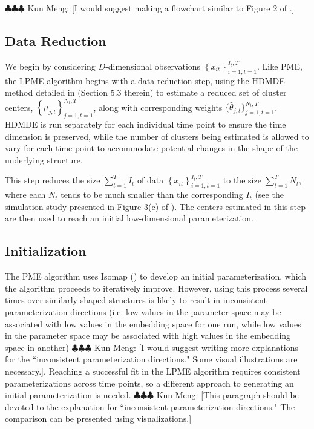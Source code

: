 \documentclass[11pt,reqno]{article}
\newcommand{\meng}[1]{{\color{purple} \sf $\clubsuit\clubsuit\clubsuit$ Kun Meng: [#1]}}
\theoremstyle{definition}
\begin{document}
\meng{I would suggest making a flowchart similar to Figure 2 of \cite{mengPrincipalManifoldEstimation2021}.}

\subsection*{Data Reduction}
We begin by considering $D$-dimensional observations $\left\{x_{it}\right\}_{i=1, t=1}^{I_t, T}$. Like PME, the LPME algorithm begins with a data reduction step, using the HDMDE method detailed in \cite{mengPrincipalManifoldEstimation2021} (Section 5.3 therein) to estimate a reduced set of cluster centers, $\left\{\mu_{j, t}\right\}_{j=1, t=1}^{N_t, T}$, along with corresponding weights $\{\hat{\theta}_{j, t}\}_{j=1, t=1}^{N_t, T}$. HDMDE is run separately for each individual time point to ensure the time dimension is preserved, while the number of clusters being estimated is allowed to vary for each time point to accommodate potential changes in the shape of the underlying structure. 

This step reduces the size $\sum_{t=1}^T I_t$ of data $\left\{x_{it}\right\}_{i=1, t=1}^{I_t, T}$ to the size $\sum_{t=1}^T N_t$, where each $N_t$ tends to be much smaller than the corresponding $I_t$ (see the simulation study presented in Figure 3(c) of \cite{mengPrincipalManifoldEstimation2021}). The centers estimated in this step are then used to reach an initial low-dimensional parameterization.

\subsection*{Initialization}
The PME algorithm uses Isomap (\cite{tenenbaumGlobalGeometricFramework2000}) to develop an initial parameterization, which the algorithm proceeds to iteratively improve. However, using this process several times over similarly shaped structures is likely to result in inconsistent parameterization directions (i.e. low values in the parameter space may be associated with low values in the embedding space for one run, while low values in the parameter space may be associated with high values in the embedding space in another) \meng{I would suggest writing more explanations for the ``inconsistent parameterization directions." Some visual illustrations are necessary.}. Reaching a successful fit in the LPME algorithm requires consistent parameterizations across time points, so a different approach to generating an initial parameterization is needed. \meng{This paragraph should be devoted to the explanation for ``inconsistent parameterization directions." The comparison can be presented using visualizations.}
\end{document}
